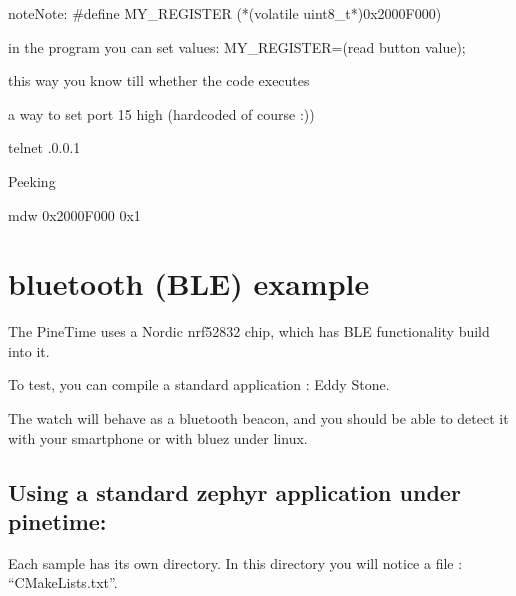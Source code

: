 \documentclass[letterpaper,10pt,english]{sphinxmanual}
\begin{document}
\begin{sphinxadmonition}{note}{Note:}
\#define MY\_REGISTER (*(volatile uint8\_t*)0x2000F000)

in the program you can set values:
MY\_REGISTER=(read button value);

this way you know till whether the code executes
\end{sphinxadmonition}

a way to set port 15 high (hard\sphinxhyphen{}coded of course :))

\begin{sphinxVerbatim}[commandchars=\\\{\}]
\end{sphinxVerbatim}

\begin{sphinxVerbatim}[commandchars=\\\{\}]
telnet .0.0.1 
\end{sphinxVerbatim}

Peeking

\begin{sphinxVerbatim}[commandchars=\\\{\}]
\PYG{g+go}{Escape character is \PYGZsq{}\PYGZca{}]\PYGZsq{}.}
mdw 0x2000F000 0x1
\end{sphinxVerbatim}


\chapter{bluetooth (BLE) example}
\label{\detokenize{bluetooth:bluetooth-ble-example}}\label{\detokenize{bluetooth::doc}}
The PineTime uses a Nordic nrf52832 chip, which has BLE functionality build into it.

To test, you can compile a standard application : Eddy Stone.

The watch will behave as a bluetooth beacon, and you should be able to detect it with your smartphone or with bluez under linux.


\section{Using a standard zephyr application under pinetime:}
\label{\detokenize{bluetooth:using-a-standard-zephyr-application-under-pinetime}}
Each sample has its own directory.
In this directory you will notice a file : “CMakeLists.txt”.
\end{document}
